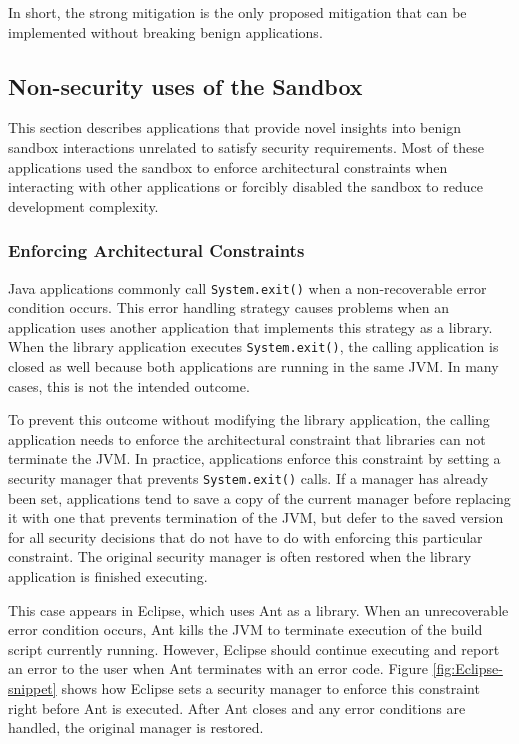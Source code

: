 \documentclass{sig-alternate}
\begin{document}
In short, the strong mitigation is the only proposed mitigation that
can be implemented without breaking benign applications.

\subsection{Non-security uses of the Sandbox}\label{sub:Non-security-uses-of}

This section describes applications that provide novel insights into benign sandbox interactions unrelated to satisfy security
requirements. Most of these applications used the
sandbox to enforce architectural constraints when interacting with
other applications or forcibly disabled the sandbox to reduce development
complexity.

\subsubsection{Enforcing Architectural Constraints}

Java applications commonly call \texttt{System.exit()} when a non-recoverable
error condition occurs. This error handling strategy causes problems
when an application uses another application that implements this
strategy as a library. When the library application executes \texttt{System.exit()},
the calling application is closed as well because both applications
are running in the same JVM. In many cases, this is not the intended
outcome. 

To prevent this outcome without modifying the library application,
the calling application needs to enforce the architectural constraint
that libraries can not terminate the JVM. In practice, applications
enforce this constraint by setting a security manager
that prevents \texttt{System.exit()} calls. If a manager has already
been set, applications tend to save a copy of the current manager
before replacing it with one that prevents termination of the JVM,
but defer to the saved version for all security decisions that do
not have to do with enforcing this particular constraint. The original
security manager is often restored when the library application is
finished executing.

This case appears in Eclipse, which uses Ant as a library. When an
unrecoverable error condition occurs, Ant kills the JVM to terminate
execution of the build script currently running. However, Eclipse
should continue executing and report an error to the user when Ant
terminates with an error code. Figure \ref{fig:Eclipse-snippet} shows
how Eclipse sets a security manager to enforce this constraint right
before Ant is executed. After Ant closes and any error conditions
are handled, the original manager is restored.
\end{document}
